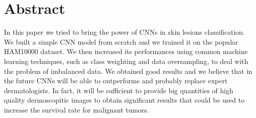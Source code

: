\chapter*{Abstract}

In this paper we tried to bring the power of CNNs in skin lesions classification. We built a simple CNN model from scratch and we trained it on the popular HAM10000\cite{article4} dataset. We then increased its performances using common machine learning techniques, such as class weighting and data oversampling, to deal with the problem of imbalanced data. We obtained good results and we believe that in the future CNNs will be able to outperforms and probably replace expert dermatologists. In fact, it will be sufficient to provide big quantities of high quality dermoscopitic images to obtain significant results that could be used to increase the survival rate for malignant tumors.

